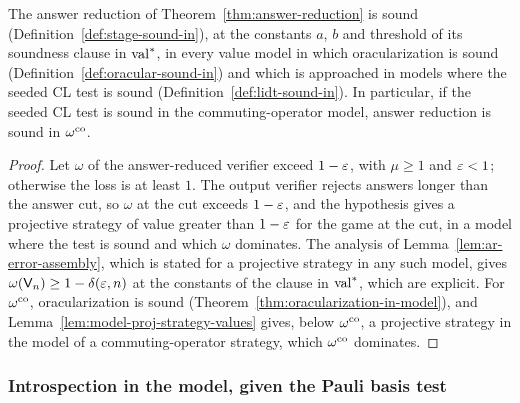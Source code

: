 \begin{theorem}
\label{thm:ar-sound-co}
\leanok
The answer reduction of Theorem~\ref{thm:answer-reduction} is sound
(Definition~\ref{def:stage-sound-in}), at the constants $a$, $b$ and threshold of its soundness
clause in $\mathrm{val}^*$, in every value model in which oracularization is sound
(Definition~\ref{def:oracular-sound-in}) and which is approached in models where the seeded CL test
is sound (Definition~\ref{def:lidt-sound-in}). In particular, if the seeded CL test is sound in the
commuting-operator model, answer reduction is sound in $\omega^{\mathrm{co}}$.
\end{theorem}

\begin{proof}
\leanok
Let $\omega$ of the answer-reduced verifier exceed $1 - \varepsilon$, with $\mu \geq 1$ and
$\varepsilon < 1$; otherwise the loss is at least $1$. The output verifier rejects answers longer than
the answer cut, so $\omega$ at the cut exceeds $1 - \varepsilon$, and the hypothesis gives a projective
strategy of value greater than $1 - \varepsilon$ for the game at the cut, in a model where the test is
sound and which $\omega$ dominates. The analysis of Lemma~\ref{lem:ar-error-assembly}, which is
stated for a projective strategy in any such model, gives $\omega(\mathsf{V}_n) \geq 1 - \delta(\varepsilon,
n)$ at the constants of the clause in $\mathrm{val}^*$, which are explicit. For $\omega^{\mathrm{co}}$,
oracularization is sound (Theorem~\ref{thm:oracularization-in-model}), and
Lemma~\ref{lem:model-proj-strategy-values} gives, below $\omega^{\mathrm{co}}$, a projective strategy in the
model of a commuting-operator strategy, which $\omega^{\mathrm{co}}$ dominates.
\end{proof}

\subsubsection{Introspection in the model, given the Pauli basis test}
\label{sec:ds-mipco-phase4}

